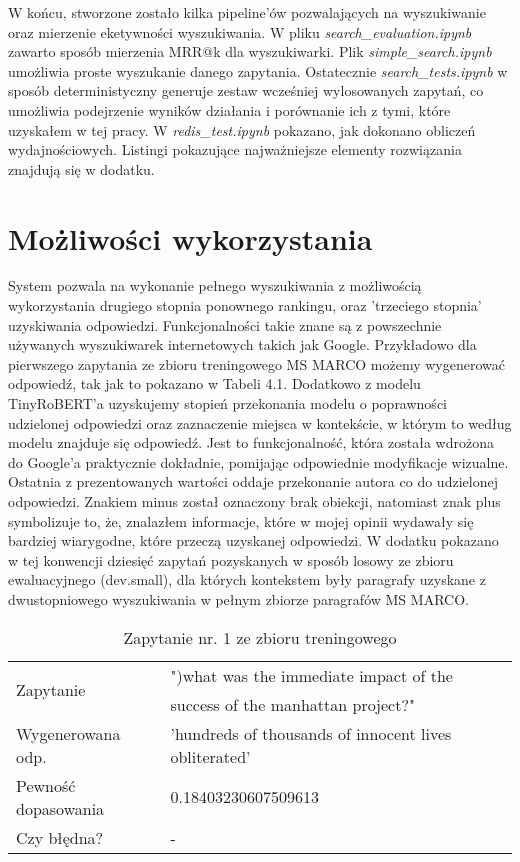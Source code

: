 W końcu, stworzone zostało kilka pipeline'ów pozwalających na wyszukiwanie oraz mierzenie eketywności wyszukiwania. W pliku \emph{search\_evaluation.ipynb} zawarto sposób mierzenia MRR@k dla wyszukiwarki. Plik \emph{simple\_search.ipynb} umożliwia proste wyszukanie danego zapytania. Ostatecznie \emph{search\_tests.ipynb} w sposób deterministyczny generuje zestaw wcześniej wylosowanych zapytań, co umożliwia podejrzenie wyników działania i porównanie ich z tymi, które uzyskałem w tej pracy. W \emph{redis\_test.ipynb} pokazano, jak dokonano obliczeń wydajnościowych. Listingi pokazujące najważniejsze elementy rozwiązania znajdują się w dodatku.

\section{Możliwości wykorzystania}

System pozwala na wykonanie pełnego wyszukiwania z możliwością wykorzystania drugiego stopnia ponownego rankingu, oraz 'trzeciego stopnia' uzyskiwania odpowiedzi. Funkcjonalności takie znane są z powszechnie używanych wyszukiwarek internetowych takich jak Google. Przykładowo dla pierwszego zapytania ze zbioru treningowego MS MARCO możemy wygenerować odpowiedź, tak jak to pokazano w Tabeli 4.1. Dodatkowo z modelu TinyRoBERT'a uzyskujemy stopień przekonania modelu o poprawności udzielonej odpowiedzi oraz zaznaczenie miejsca w kontekście, w którym to według modelu znajduje się odpowiedź. Jest to funkcjonalność, która została wdrożona do Google'a praktycznie dokładnie, pomijając odpowiednie modyfikacje wizualne. Ostatnia z prezentowanych wartości oddaje przekonanie autora co do udzielonej odpowiedzi. Znakiem minus został oznaczony brak obiekcji, natomiast znak plus symbolizuje to, że, znalazłem informacje, które w mojej opinii wydawały się bardziej wiarygodne, które przeczą uzyskanej odpowiedzi. W dodatku pokazano w tej konwencji dziesięć zapytań pozyskanych w sposób losowy ze zbioru ewaluacyjnego (dev.small), dla których kontekstem były paragrafy uzyskane z dwustopniowego wyszukiwania w pełnym zbiorze paragrafów MS MARCO. \newline

\begin{table}[htp]
\centering
\caption{Zapytanie nr. 1 ze zbioru treningowego}
\vspace*{5mm}
\begin{tabular}{llll}
   \multirow{2}{3em}{Zapytanie} & ")what was the immediate impact of the \\
    & success of the manhattan project?"\\
   \hline
    Wygenerowana odp. & 'hundreds of thousands of innocent lives obliterated' \\
    \hline
    Pewność dopasowania &  0.18403230607509613\\
    \hline
    Czy błędna? & -\\
\end{tabular}
\end{table}


